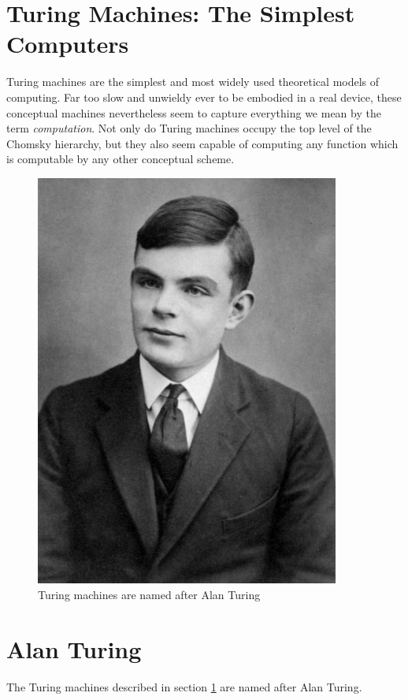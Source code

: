 \documentclass[a4paper]{article}
\begin{document}
\section{Turing Machines: The Simplest Computers}
\label{sec:simplest}
Turing machines are the simplest and most widely used theoretical models of computing. Far too slow and unwieldy ever to be embodied in a real device, these conceptual machines nevertheless seem to capture everything we mean by the term \textit{computation}. Not only do Turing machines occupy the top level of the Chomsky hierarchy, but they also seem capable of computing any function which is computable by any other conceptual scheme.

\begin{figure}
\includegraphics[width=10cm]{Alan_Turing_Aged_16.jpg}
\caption{Turing machines are named after Alan Turing}
\label{figure:turing}
\end{figure}



\section{Alan Turing}
The Turing machines described in section \ref{sec:simplest} are named after Alan Turing.
\end{document}

